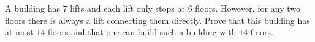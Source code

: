A building has $7$ lifts and each lift only stops at $6$ floors.
However, for any two floors there is always a lift connecting them directly.
Prove that this building has at most $14$ floors and that one can build such a building with $14$ floors.

